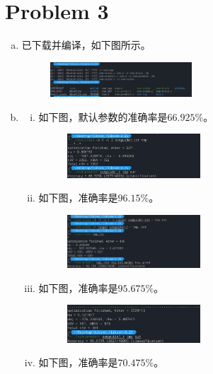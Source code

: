 \documentclass[a4paper,UTF8]{article}
\numberwithin{equation}{section}
\begin{document}
\section*{Problem 3}
\begin{enumerate}[(a)]
    \item 已下载并编译，如下图所示。
    \begin{figure}[H]
		\centering
		\includegraphics[width=0.5\textwidth]{pic/q1.png}
		\label{Fig.1}
	\end{figure}
    \item \begin{enumerate}[i.]
        \item 如下图，默认参数的准确率是$66.925\%$。
        \begin{figure}[H]
		\centering
		\includegraphics[width=0.5\textwidth]{pic/q2.png}
		\label{Fig.2}
	\end{figure}
        \item 如下图，准确率是$96.15\%$。
        \begin{figure}[H]
		\centering
		\includegraphics[width=0.5\textwidth]{pic/q3.png}
		\label{Fig.2}
	\end{figure}
        \item 如下图，准确率是$95.675\%$。
        \begin{figure}[H]
		\centering
		\includegraphics[width=0.5\textwidth]{pic/q4.png}
		\label{Fig.2}
	\end{figure}
        \item 如下图，准确率是$70.475\%$。

\end{enumerate}
\end{enumerate}
\end{document}
